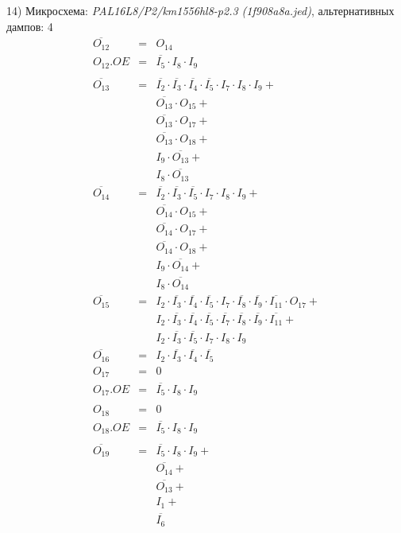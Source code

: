 \documentclass[a4paper,russian]{report}
\begin{document}
14) Микросхема: \emph{PAL16L8/P2/km1556hl8-p2.3  (1f908a8a.jed)}, альтернативных дампов: 4
\nopagebreak\begin{eqnarray*}
    \overline{O_{12}} & = & O_{14} \\
    O_{12}.OE & = & \overline{I_{5}} \cdotp I_{8} \cdotp I_{9} \\ \\
    \overline{O_{13}} & = & \overline{I_{2}} \cdotp \overline{I_{3}} \cdotp \overline{I_{4}} \cdotp \overline{I_{5}} \cdotp I_{7} \cdotp I_{8} \cdotp I_{9} + \\
	& &  \overline{O_{13}} \cdotp O_{15} + \\
	& &  \overline{O_{13}} \cdotp O_{17} + \\
	& &  \overline{O_{13}} \cdotp O_{18} + \\
	& &  I_{9} \cdotp \overline{O_{13}} + \\
	& &  I_{8} \cdotp \overline{O_{13}} \\
    \overline{O_{14}} & = & \overline{I_{2}} \cdotp \overline{I_{3}} \cdotp \overline{I_{5}} \cdotp I_{7} \cdotp I_{8} \cdotp I_{9} + \\
	& &  \overline{O_{14}} \cdotp O_{15} + \\
	& &  \overline{O_{14}} \cdotp O_{17} + \\
	& &  \overline{O_{14}} \cdotp O_{18} + \\
	& &  I_{9} \cdotp \overline{O_{14}} + \\
	& &  I_{8} \cdotp \overline{O_{14}} \\
    \overline{O_{15}} & = & I_{2} \cdotp \overline{I_{3}} \cdotp \overline{I_{4}} \cdotp \overline{I_{5}} \cdotp I_{7} \cdotp \overline{I_{8}} \cdotp \overline{I_{9}} \cdotp \overline{I_{11}} \cdotp O_{17} + \\
	& &  I_{2} \cdotp \overline{I_{3}} \cdotp \overline{I_{4}} \cdotp \overline{I_{5}} \cdotp \overline{I_{7}} \cdotp \overline{I_{8}} \cdotp \overline{I_{9}} \cdotp \overline{I_{11}} + \\
	& &  I_{2} \cdotp \overline{I_{3}} \cdotp \overline{I_{5}} \cdotp I_{7} \cdotp I_{8} \cdotp I_{9} \\
    \overline{O_{16}} & = & I_{2} \cdotp \overline{I_{3}} \cdotp \overline{I_{4}} \cdotp \overline{I_{5}} \\
    O_{17} & = & 0 \\
    O_{17}.OE & = & \overline{I_{5}} \cdotp I_{8} \cdotp I_{9} \\ \\
    O_{18} & = & 0 \\
    O_{18}.OE & = & \overline{I_{5}} \cdotp I_{8} \cdotp I_{9} \\ \\
    \overline{O_{19}} & = & \overline{I_{5}} \cdotp I_{8} \cdotp I_{9} + \\
	& &  \overline{O_{14}} + \\
	& &  \overline{O_{13}} + \\
	& &  I_{1} + \\
	& &  \overline{I_{6}} \\
 \end{eqnarray*}
\pagebreak[1]
\end{document}
